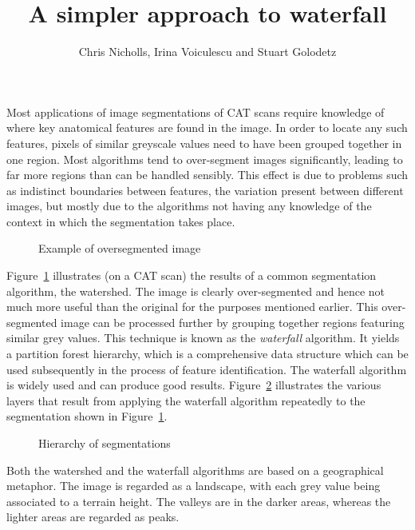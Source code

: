 \documentclass[12pt]{ouclprgsc}
\title{\LARGE \bf
A simpler approach to waterfall
}
\author{Chris Nicholls, Irina Voiculescu and Stuart Golodetz
}
\institute{Oxford University Computing Laboratory}
\begin{document}
\maketitle
\pagestyle{empty}



Most applications of image segmentations of CAT scans require
knowledge of where key anatomical features are found in the image. In
order to locate any such features, pixels of similar greyscale values
need to have been grouped together in one region. Most algorithms tend
to over-segment images significantly, leading to far more regions than
can be handled sensibly. This effect is due to problems such as
indistinct boundaries between features, the variation present between
different images, but mostly due to the algorithms not having any
knowledge of the context in which the segmentation takes place.

\begin{figure}
\centering
\ifpdf
        {}%
\else
\fi
\caption{Example of oversegmented image}
\label{fig:oversegmented}
\end{figure}

Figure~\ref{fig:oversegmented} illustrates (on a CAT scan) the results
of a common segmentation algorithm, the watershed. The image is
clearly over-segmented and hence not much more useful than the
original for the purposes mentioned earlier. This over-segmented image
can be processed further by grouping together regions featuring
similar grey values. This technique is known as the {\em waterfall\/}
algorithm. It yields a partition forest hierarchy, which is a
comprehensive data structure which can be used subsequently in the
process of feature identification. The waterfall algorithm is widely
used and can produce good results.
Figure~\ref{fig:waterfall} illustrates the various layers that result
from applying the waterfall algorithm repeatedly to the segmentation
shown in Figure~\ref{fig:oversegmented}.

\begin{figure}
\centering
\ifpdf
        {}%
\else
\fi
\caption{Hierarchy of segmentations}
\label{fig:waterfall}
\end{figure}


Both the watershed and the waterfall algorithms are based on a
geographical metaphor. The image is regarded as a landscape, with each
grey value being associated to a terrain height. The valleys are in
the darker areas, whereas the lighter areas are regarded as peaks.
\end{document}
